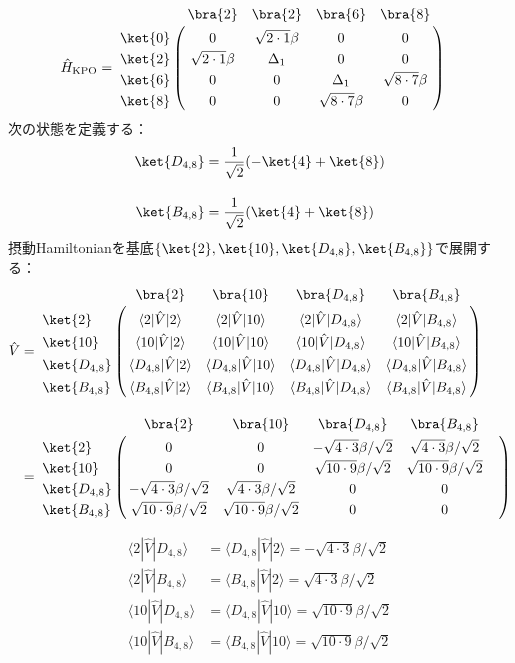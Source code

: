 \begin{align}
     \hat{H}_{\rm{KPO}}
    &=
   \bordermatrix{     
    & \bra{2} &  \bra{2} &  \bra{6}&  \bra{8}\cr
   \ket{0}&0&\sqrt{2\cdot1}\beta&0&0\cr
  \ket{2}&\sqrt{2\cdot1}\beta&\Delta_1&0&0\cr
  \ket{6}&0&0&\Delta_1&\sqrt{8\cdot7}\beta\cr
  \ket{8}&0&0&\sqrt{8\cdot7}\beta&0\cr
            }
\end{align}
次の状態を定義する：
\begin{align}
    \ket{D_{4,8}} &= \frac{1}{\sqrt{2}}(-\ket{4}+\ket{8})\\[10pt]
    \ket{B_{4,8}} &= \frac{1}{\sqrt{2}}(\ket{4}+\ket{8})
\end{align}
摂動Hamiltonianを基底$\{\ket{2},\ket{10},\ket{D_{4,8}},\ket{B_{4,8}}\}$で展開する：
\begin{align}
     \hat{V}
    &=
   \bordermatrix{     
    & \bra{2} &  \bra{10} &  \bra{D_{4,8}}&  \bra{B_{4,8}}\cr
   \ket{2}&\langle{2|\hat{V}|2}\rangle&\langle{2|\hat{V}|10}\rangle&\langle{2|\hat{V}|D_{4,8}}\rangle
   &\langle{2|\hat{V}|B_{4,8}}\rangle\cr
  \ket{10}&\langle{10|\hat{V}|2}\rangle&\langle{10|\hat{V}|10}\rangle&\langle{10|\hat{V}|D_{4,8}}\rangle
   &\langle{10|\hat{V}|B_{4,8}}\rangle\cr
  \ket{D_{4,8}}&\langle{D_{4,8}|\hat{V}|2}\rangle&\langle{D_{4,8}|\hat{V}|10}\rangle&\langle{D_{4,8}|\hat{V}|D_{4,8}}\rangle
   &\langle{D_{4,8}|\hat{V}|B_{4,8}}\rangle\cr
  \ket{B_{4,8}}&\langle{B_{4,8}|\hat{V}|2}\rangle&\langle{B_{4,8}|\hat{V}|10}\rangle&\langle{B_{4,8}|\hat{V}|D_{4,8}}\rangle
   &\langle{B_{4,8}|\hat{V}|B_{4,8}}\rangle\cr
    }\\[10pt]
    &=
   \bordermatrix{     
   & \bra{2} &  \bra{10} &  \bra{D_{4,8}}&  \bra{B_{4,8}}\cr
   \ket{2}&0&0&-\sqrt{4\cdot3}\beta/\sqrt{2}&\sqrt{4\cdot3}\beta/\sqrt{2}\cr
  \ket{10}&0&0&\sqrt{10\cdot9}\beta/\sqrt{2}&\sqrt{10\cdot9}\beta/\sqrt{2}\cr
  \ket{D_{4,8}}&-\sqrt{4\cdot3}\beta/\sqrt{2}&\sqrt{4\cdot3}\beta/\sqrt{2}&0&0\cr
  \ket{B_{4,8}}&\sqrt{10\cdot9}\beta/\sqrt{2}&\sqrt{10\cdot9}\beta/\sqrt{2}&0&0&\cr
            }
\end{align}

\begin{align}
    \langle{2|\hat{V}|D_{4,8}}\rangle&=\langle{D_{4,8}|\hat{V}|2}\rangle
    =-\sqrt{4\cdot3}\beta/\sqrt{2}\\[10pt]
    \langle{2|\hat{V}|B_{4,8}}\rangle&=\langle{B_{4,8}|\hat{V}|2}\rangle
    =\sqrt{4\cdot3}\beta/\sqrt{2}\\[10pt]
    \langle{10|\hat{V}|D_{4,8}}\rangle&=\langle{D_{4,8}|\hat{V}|10}\rangle
    =\sqrt{10\cdot9}\beta/\sqrt{2}\\[10pt]
   \langle{10|\hat{V}|B_{4,8}}\rangle&=\langle{B_{4,8}|\hat{V}|10}\rangle
   =\sqrt{10\cdot9}\beta/\sqrt{2}
\end{align}


